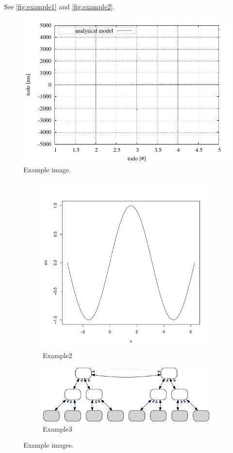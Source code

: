 See \autoref{fig:example1} and \autoref{fig:example2}.

\begin{figure}
    \centering
    \includegraphics[width=.45\textwidth]{resources/images/example1.pdf} 
    \caption{Example image.}
    \label{fig:example1}
\end{figure}

\begin{figure}
    \begin{subfigure}[b]{.5\textwidth}
    	\centering
		\includegraphics[width=.5\textwidth]{resources/images/example2.pdf}
		\caption{Example2}
        \label{fig:example2}
    \end{subfigure}
    \begin{subfigure}[b]{.5\textwidth}
    	\centering
		\includegraphics[width=.5\textwidth]{resources/images/example3.pdf}
		\caption{Example3}
        \label{fig:example3}
    \end{subfigure}    
    \caption{Example images.}
    \label{fig:exammple2_3}
\end{figure}

